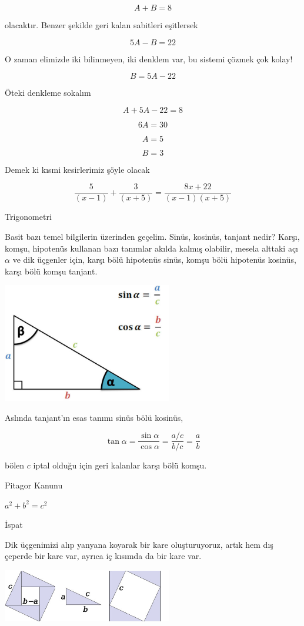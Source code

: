 \documentclass[12pt,fleqn]{article}\usepackage{../../common}
\begin{document}
$$ A + B = 8 $$

olacaktır. Benzer şekilde geri kalan sabitleri eşitlersek 

$$ 5A - B = 22 $$

O zaman elimizde iki bilinmeyen, iki denklem var, bu sistemi çözmek çok
kolay! 

$$ B = 5A - 22 $$

Öteki denkleme sokalım

$$ A + 5A - 22 = 8 $$

$$ 6A = 30 $$

$$ A = 5 $$

$$ B = 3 $$

Demek ki kısmi kesirlerimiz şöyle olacak 

$$ \frac{5}{(x-1)} + \frac{3}{(x+5)} = \frac{8x + 22}{(x-1)(x+5)}$$

\newpage

Trigonometri

Basit bazı temel bilgilerin üzerinden geçelim. Sinüs, kosinüs, tanjant nedir?
Karşı, komşu, hipotenüs kullanan bazı tanımlar akılda kalmış olabilir, mesela
alttaki açı $\alpha$ ve dik üçgenler için, karşı bölü hipotenüs sinüs, komşu
bölü hipotenüs kosinüs, karşı bölü komşu tanjant.

\includegraphics[width=20em]{trig-reciprocal.jpg}

Aslında tanjant'ın esas tanımı sinüs bölü kosinüs,

$$
\tan \alpha = \frac{\sin\alpha}{\cos\alpha} = \frac{a / c}{b / c} = \frac{a}{b}
$$

bölen $c$ iptal olduğu için geri kalanlar karşı bölü komşu. 

Pitagor Kanunu

$a^2 + b^2 = c^2$

İspat

Dik üçgenimizi alıp yanyana koyarak bir kare oluşturuyoruz, artık hem dış
çeperde bir kare var, ayrıca iç kısımda da bir kare var. 

\includegraphics[width=20em]{Pythagoras.png}
\end{document}
